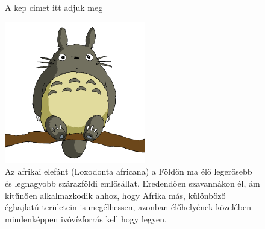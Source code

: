 \documentclass[a4paper]{article}
\begin{document}
\begin{figure}[ht!]
	\centering
	\caption{A kep cimet itt adjuk meg}
\end{figure}
\begin{figure}
	\centering
	\includegraphics[width=0.55\textwidth]{totoro.png}
	\caption{Az afrikai elefánt (Loxodonta africana) a Földön ma élő legerősebb és legnagyobb szárazföldi emlősállat. Eredendően szavannákon él, ám kitűnően alkalmazkodik ahhoz, hogy Afrika más, különböző éghajlatú területein is megélhessen, azonban élőhelyének közelében mindenképpen ivóvízforrás kell hogy legyen.}
\end{figure}
\end{document}
